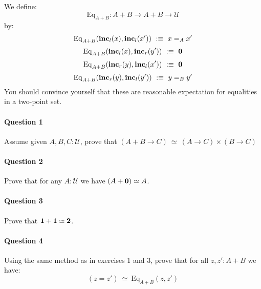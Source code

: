 \documentclass{article}[6pt]%
\newcommand{\U}{{\mathcal U}}
\renewcommand{\r}{\rightarrow}
\newcommand{\inc}{\mathrm{\bf inc}}
\newcommand{\one}{{\bf 1}}
\newcommand{\zero}{{\bf 0}}
\newcommand{\two}{{\bf 2}}
\newcommand{\Eq}{\mathrm{Eq}}
\begin{document}
\begin{Exercise}[title={Sum types}]

We define: 
\[\Eq_{A+B} : A+B \r A+B \r \U\] 
by:
\[\Eq_{A+B}(\inc_l(x),\inc_l(x')) \ :\equiv \ x=_Ax'\]
\[\Eq_{A+B}(\inc_l(x),\inc_r(y')) \ :\equiv \ \zero\]
\[\Eq_{A+B}(\inc_r(y),\inc_l(x')) \ :\equiv \ \zero\]
\[\Eq_{A+B}(\inc_r(y),\inc_l(y')) \ :\equiv \ y=_By'\]
You should convince yourself that these are reasonable expectation for equalities in a two-point set.

\paragraph{Question 1} Assume given $A,B,C:\U$, prove that $(A+B\r C) \ \simeq \ (A\r C)\times (B\r C)$

\paragraph{Question 2} Prove that for any $A:\U$ we have $(A+\zero)\simeq A$.

\paragraph{Question 3} Prove that $\one+\one  \simeq  \two$.

\paragraph{Question 4} Using the same method as in exercises 1 and 3, prove that for all $z,z':A+B$ we have:
\[(z=z') \ \simeq\ \Eq_{A+B}(z,z')\]

\end{Exercise}
\end{document}
